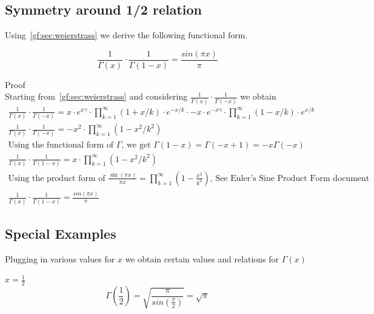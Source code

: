 \documentclass[a4paper]{article}
\begin{document}
    \subsection{Symmetry around 1/2 relation}\label{gf:subsec:symmetric-gamma}
    Using~\ref{gf:sec:weierstrass} we derive the following functional form.

    \begin{theorem}
        \begin{equation}
            \label{gf:eq:symmetric-gamma-eq}
            \boxed{
                \frac{1}{\Gamma(x)}\cdot \frac{1}{\Gamma(1-x)} = \frac{sin(\pi x)}{\pi}
            }
        \end{equation}

        Proof
        \\
        Starting from~\ref{gf:sec:weierstrass} and considering $\frac{1}{\Gamma(x)}\cdot \frac{1}{\Gamma(-x)}$ we obtain
        \begin{gather*}
            \frac{1}{\Gamma(x)}\cdot \frac{1}{\Gamma(-x)} = x \cdot e^{x \gamma} \cdot \prod_{k=1}^{\infty} (1 + x/k) \cdot e^{-x/k}   \cdot -x \cdot e^{-x \gamma} \cdot \prod_{k=1}^{\infty} (1 - x/k) \cdot e^{x/k}
            \\
            \frac{1}{\Gamma(x)}\cdot \frac{1}{\Gamma(-x)} = -x^2 \cdot \prod_{k=1}^{\infty} (1 - x^2/k^2) \\
            \text{Using the functional form of $\Gamma$, we get $\Gamma(1-x) = \Gamma(-x+1) = -x \Gamma(-x)$}
            \\
            \frac{1}{\Gamma(x)}\cdot \frac{1}{\Gamma(1-x)} = x \cdot \prod_{k=1}^{\infty} (1 - x^2/k^2) \\
            \text{Using the product form of $\frac{\sin(\pi x)}{\pi x} = \prod_{k=1}^{\infty} \left( 1-\frac{x^2}{k^2} \right)$
                , See Euler's Sine Product Form document}
            \\
            \frac{1}{\Gamma(x)}\cdot \frac{1}{\Gamma(1-x)} = \frac{sin(\pi x)}{\pi}
        \end{gather*}
    \end{theorem}

    \subsection{Special Examples}\label{gf:subsec:special-examples}
    Plugging in various values for $x$ we obtain certain values and relations for $\Gamma(x)$

    $x = \frac{1}{2}$
    \begin{equation}
        \label{gf:eq:gamma-half}
        \Gamma(\frac{1}{2}) = \sqrt{\frac{\pi}{sin(\frac{\pi}{2})}} = \sqrt{\pi}
    \end{equation}
\end{document}
